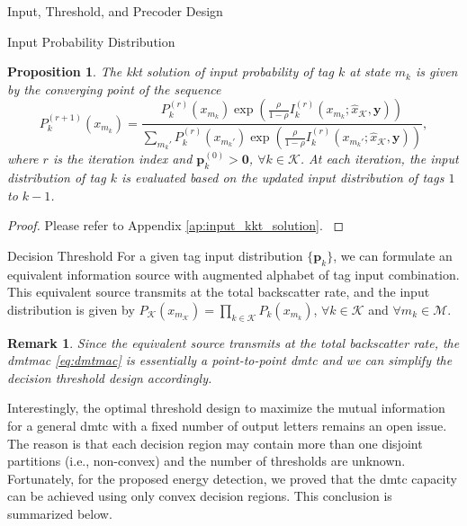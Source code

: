 \documentclass[journal]{IEEEtran}
\newtheorem{proposition}{Proposition}
\newtheorem{remark}{Remark}
\begin{document}
\begin{section}{Input, Threshold, and Precoder Design}
\begin{subsection}{Input Probability Distribution}
		\begin{proposition}
			The \gls{kkt} solution of input probability of tag $k$ at state $m_k$ is given by the converging point of the sequence
			\begin{equation}
				P_k^{(r+1)}(x_{m_k}) = \frac{P_k^{(r)}(x_{m_k}) \exp \left( \frac{\rho}{1 - \rho} I_k^{(r)}(x_{m_k};\hat{x}_{\mathcal{K}},\boldsymbol{y}) \right)}{\sum_{m_k'} P_k^{(r)}(x_{m_k'}) \exp \left( \frac{\rho}{1 - \rho} I_k^{(r)}(x_{m_k'};\hat{x}_{\mathcal{K}},\boldsymbol{y}) \right)},
				\label{eq:input_kkt_solution}
			\end{equation}
			where $r$ is the iteration index and $\boldsymbol{p}_k^{(0)} > \boldsymbol{0}$, $\forall k \in \mathcal{K}$.
			At each iteration, the input distribution of tag $k$ is evaluated based on the updated input distribution of tags $1$ to $k-1$.
			\label{pr:input_kkt_solution}
		\end{proposition}
		\begin{proof}
			Please refer to Appendix \ref{ap:input_kkt_solution}.
			\label{pf:input_kkt_solution}
		\end{proof}
	\end{subsection}


	\begin{subsection}{Decision Threshold}
		For a given tag input distribution $\{\boldsymbol{p}_k\}$, we can formulate an equivalent information source with augmented alphabet of tag input combination.
		This equivalent source transmits at the total backscatter rate, and the input distribution is given by $P_{\mathcal{K}}(x_{m_{\mathcal{K}}}) = \prod_{k \in \mathcal{K}} P_k(x_{m_k})$, $\forall k \in \mathcal{K}$ and $\forall m_k \in \mathcal{M}$.

		\begin{remark}
			Since the equivalent source transmits at the total backscatter rate, the \gls{dmtmac} \eqref{eq:dmtmac} is essentially a point-to-point \gls{dmtc} and we can simplify the decision threshold design accordingly.
			\label{re:input_combination}
		\end{remark}

		Interestingly, the optimal threshold design to maximize the mutual information for a general \gls{dmtc} with a fixed number of output letters remains an open issue.
		The reason is that each decision region may contain more than one disjoint partitions (i.e., non-convex) and the number of thresholds are unknown.
		Fortunately, for the proposed energy detection, we proved that the \gls{dmtc} capacity can be achieved using only convex decision regions.
		This conclusion is summarized below.


\end{subsection}
\end{section}
\end{document}
